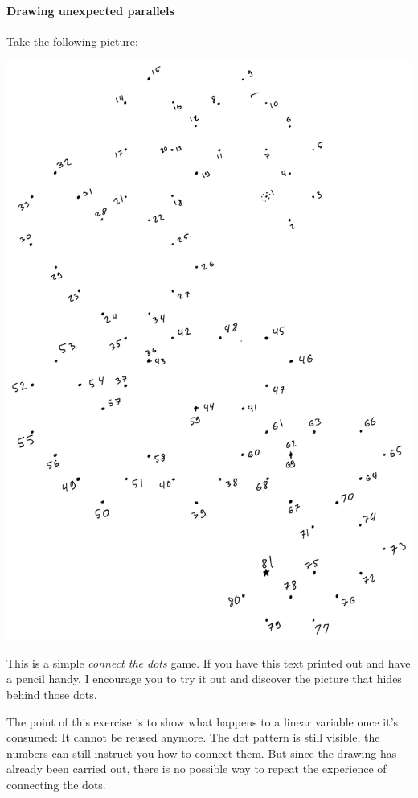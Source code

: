 \documentclass[
]{article}
\begin{document}
\hypertarget{drawing-unexpected-parallels}{%
\paragraph{Drawing unexpected
parallels}\label{drawing-unexpected-parallels}}

Take the following picture:

\includegraphics{A1AB5AFB-31BB-4E50-ABBE-7EDE8D4CA146.png}

This is a simple \emph{connect the dots} game. If you have this text
printed out and have a pencil handy, I encourage you to try it out and
discover the picture that hides behind those dots.

The point of this exercise is to show what happens to a linear variable
once it's consumed: It cannot be reused anymore. The dot pattern is
still visible, the numbers can still instruct you how to connect them.
But since the drawing has already been carried out, there is no possible
way to repeat the experience of connecting the dots.
\end{document}

